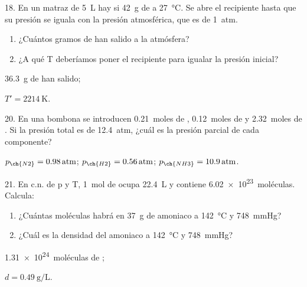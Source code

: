 \documentclass[11pt]{article}
\begin{document}
\begin{multicols}{2}
\begin{exercise}
  18. En un matraz de \SI{5}{\liter} hay si \SI{42}{\gram} de  a \SI{27}{\celsius}. Se abre el recipiente
  hasta que su presión se iguala con la presión atmosférica,
  que es de \SI{1}{atm}.
  \begin{enumerate}
    \item ¿Cuántos gramos de  han salido a la atmósfera?
    \item ¿A qué T deberíamos poner el recipiente para igualar la presión inicial?
  \end{enumerate}
\end{exercise}
\begin{solution}
  \begin{enumerate*}
    \item \SI{36.3}{\gram} de  han salido;
    \item $T' = \SI{2214}{\kelvin}$.
  \end{enumerate*}
\end{solution}

\begin{exercise}
  20. En una bombona se introducen \SI{0.21}{moles} de , \SI{0.12}{moles}
  de  y \SI{2.32}{moles} de . Si la presión total es de \SI{12.4}{atm}, ¿cuál es la presión parcial de cada componente?
\end{exercise}
\begin{solution}
  $p_{\ch{N2}} = \SI{0.98}{atm}$; $p_{\ch{H2}} = \SI{0.56}{atm}$; $p_{\ch{NH3}} = \SI{10.9}{atm}$.
\end{solution}

\begin{exercise}
  21. En c.n. de p y T, \SI{1}{mol} de  ocupa \SI{22.4}{\liter} y contiene \SI{6.02e23}{moléculas}. Calcula:
  \begin{enumerate}
    \item ¿Cuántas moléculas habrá en \SI{37}{\gram} de amoniaco a \SI{142}{\celsius} y \SI{748}{\mmHg}?
    \item ¿Cuál es la densidad del amoniaco a \SI{142}{\celsius} y \SI{748}{\mmHg}?
  \end{enumerate}
\end{exercise}
\begin{solution}
  \begin{enumerate*}
    \item \SI{1.31e24}{moléculas} de ; \item $d = \SI{0.49}{\gram\per\liter}$.
  \end{enumerate*}
\end{solution}


\end{multicols}
\end{document}
